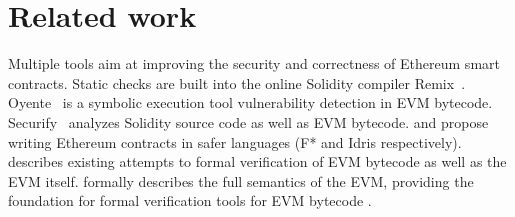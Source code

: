 \section{Related work} \label{RelatedWork}

Multiple tools aim at improving the security and correctness of Ethereum smart contracts.
Static checks are built into the online Solidity compiler Remix~\cite{BrowserSolidity}.
Oyente~\cite{Luu2016} is a symbolic execution tool vulnerability detection in EVM bytecode.
Securify~\cite{Tsankov2018} analyzes Solidity source code as well as EVM bytecode. %
\cite{Bhargavan2016} and \cite{Pettersson2016} propose writing Ethereum contracts in safer languages (F* and Idris respectively).
\cite{Hirai2017} describes existing attempts to formal verification of EVM bytecode as well as the EVM itself.
\cite{Hildenbrandt2018} formally describes the full semantics of the EVM, providing the foundation for formal verification tools for EVM bytecode .
